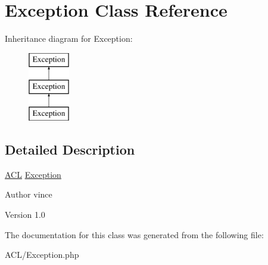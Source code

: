 \hypertarget{class_anemo_1_1_a_c_l_1_1_exception}{
\section{Exception Class Reference}
\label{class_anemo_1_1_a_c_l_1_1_exception}
}
Inheritance diagram for Exception:\begin{figure}[H]
\begin{center}
\leavevmode
\includegraphics[height=3.000000cm]{class_anemo_1_1_a_c_l_1_1_exception}
\end{center}
\end{figure}


\subsection{Detailed Description}
\hyperlink{class_anemo_1_1_a_c_l}{ACL} \hyperlink{class_anemo_1_1_a_c_l_1_1_exception}{Exception} \begin{DoxyAuthor}{Author}
vince 
\end{DoxyAuthor}
\begin{DoxyVersion}{Version}
1.0 
\end{DoxyVersion}


The documentation for this class was generated from the following file:\begin{DoxyCompactItemize}
\item 
ACL/Exception.php\end{DoxyCompactItemize}
